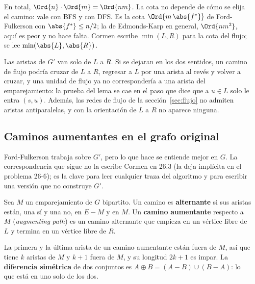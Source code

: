 \documentclass[11pt,letterpaper]{article}
\begin{document}
En total, $\Ord{n} \cdot \Ord{m} = \Ord{nm}$. La cota no depende de
cómo se elija el camino: vale con BFS y con DFS. Es la cota
$\Ord{m\,\abs{f^*}}$ de Ford-Fulkerson con $\abs{f^*} \le n/2$; la de
Edmonds-Karp en general, $\Ord{nm^2}$, aquí es peor y no hace falta.
Cormen escribe $\min(L, R)$ para la cota del flujo; se lee
$\min(\abs{L}, \abs{R})$.

\begin{ojo}
  Las aristas de $G'$ van solo de $L$ a $R$. Si se dejaran en los dos
  sentidos, un camino de flujo podría cruzar de $L$ a $R$, regresar a
  $L$ por una arista al revés y volver a cruzar, y una unidad de flujo
  ya no correspondería a una arista del emparejamiento: la prueba del
  lema se cae en el paso que dice que a $u \in L$ solo le entra
  $(s, u)$. Además, las redes de flujo de la
  sección~\ref{sec:flujo} no admiten aristas antiparalelas, y con la
  orientación de $L$ a $R$ no aparece ninguna.
\end{ojo}


\subsection*{Caminos aumentantes en el grafo original}

Ford-Fulkerson trabaja sobre $G'$, pero lo que hace se entiende mejor
en $G$. La correspondencia que sigue no la escribe Cormen en 26.3 (la
deja implícita en el problema 26-6); es la clave para leer cualquier
traza del algoritmo y para escribir una versión que no construye
$G'$.

\begin{definicion}
  \label{def:camino-aumentante-emparejamiento}
  Sea $M$ un emparejamiento de $G$ bipartito. Un camino es
  \textbf{alternante} si sus aristas están, una sí y una no, en
  $E - M$ y en $M$. Un \textbf{camino aumentante} respecto a $M$
  (\textit{augmenting path}) es un camino alternante que empieza en
  un vértice libre de $L$ y termina en un vértice libre de $R$.
\end{definicion}

La primera y la última arista de un camino aumentante están fuera de
$M$, así que tiene $k$ aristas de $M$ y $k + 1$ fuera de $M$, y su
longitud $2k + 1$ es impar. La \textbf{diferencia simétrica} de dos
conjuntos es $A \oplus B = (A - B) \cup (B - A)$: lo que está en uno
solo de los dos.
\end{document}
